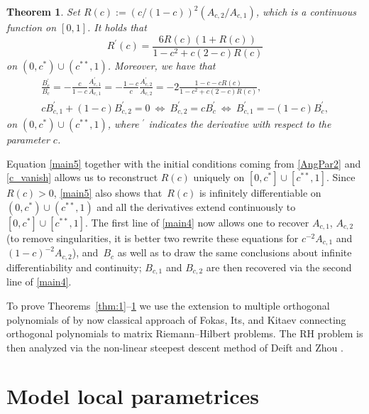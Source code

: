 \documentclass[10pt,a4paper]{amsart}
\numberwithin{equation}{section}
\newtheorem{Theorem}{Theorem}[section]
\begin{document}
\begin{Theorem}
\label{thm:4}
Set $ R(c) := (c/(1-c))^2 (A_{c,2}/A_{c,1}) $, which is a continuous function on $ [0,1] $. It holds that
\begin{equation}
\label{main5}
R^\prime(c) = \frac{6R(c)(1+R(c))}{1-c^2+c(2-c)R(c)}
\end{equation}
on $ (0,c^*)\cup(c^{**},1) $. Moreover, we have that
\begin{gather}
 \frac{B_c^\prime}{B_c} = -\frac c{1-c} \frac{A_{c,1}^\prime}{A_{c,1}} = -\frac{1-c}c \frac{A_{c,2}^\prime}{A_{c,2}} = -2\frac{1-c-cR(c)}{1-c^2+c(2-c)R(c)},\nonumber \\
c B_{c,1}^\prime + (1-c) B_{c,2}^\prime = 0 \ \Leftrightarrow \ B_{c,2}^\prime = c B_c^\prime \ \Leftrightarrow \ B_{c,1}^\prime = -(1-c) B_c^\prime,\label{main4}
\end{gather}
on $ (0,c^*)\cup(c^{**},1) $, where $ ^\prime $ indicates the derivative with respect to the parameter $ c $.
\end{Theorem}


\begin{Remark}
Equation \eqref{main5} together with the initial conditions coming from \eqref{AngPar2} and \eqref{c_vanish} allows us to reconstruct $ R(c) $ uniquely on $ [0,c^*]\cup[c^{**},1] $. Since~$ R(c)>0 $, \eqref{main5} also shows that~$ R(c) $ is infinitely differentiable on $ (0,c^*)\cup(c^{**},1) $ and all the derivatives extend continuously to $ [0,c^*]\cup[c^{**},1] $. The first line of \eqref{main4} now allows one to recover $ A_{c,1} $, $ A_{c,2} $ \big(to remove singularities, it is better two rewrite these equations for $ c^{-2}A_{c,1} $ and $ (1-c)^{-2} A_{c,2} $\big), and~$ B_c $ as well as to draw the same conclusions about infinite differentiability and continuity; $ B_{c,1} $ and $ B_{c,2} $ are then recovered via the second line of \eqref{main4}.
\end{Remark}

To prove Theorems~\ref{thm:1}--\ref{thm:4} we use the extension to multiple orthogonal polynomials \cite{GerKVA01} of by now classical approach of Fokas, Its, and Kitaev \cite{FIK91,FIK92} connecting orthogonal polynomials to matrix Riemann--Hilbert problems. The RH problem is then analyzed via the non-linear steepest descent method of Deift and Zhou \cite{DZ93}.



\section{Model local parametrices}
\label{sec:MLP}
\end{document}
